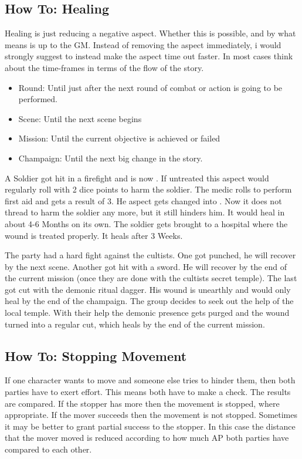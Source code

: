 \documentclass[11pt]{article}
\begin{document}
{\subsection{How To: Healing}
\label{sec:orgf635745}
Healing is just reducing a negative aspect. Whether this is possible, and by what means is up to the GM. Instead of removing the aspect immediately, i would strongly suggest to instead make the aspect time out faster. In most cases think about the time-frames in terms of the flow of the story.
\begin{itemize}
\item Round: Until just after the next round of combat or action is going to be performed.
\item Scene: Until the next scene begins
\item Mission: Until the current objective is achieved or failed
\item Champaign: Until the next big change in the story.
\end{itemize}

\begin{pwexample}
A Soldier got hit in a firefight and is now . If untreated this aspect would regularly roll with 2 dice points to harm the soldier. The medic rolls to perform first aid and gets a result of 3. He aspect gets changed into . Now it does not thread to harm the soldier any more, but it still hinders him. It would heal in about 4-6 Months on its own. The soldier gets brought to a hospital where the wound is treated properly. It heals after 3 Weeks. 
\end{pwexample}

\begin{pwexample}
The party had a hard fight against the cultists. One got punched, he will recover by the next scene. Another got hit with a sword. He will recover by the end of the current mission (once they are done with the cultists secret temple). The last got cut with the demonic ritual dagger. His wound is unearthly and would only heal by the end of the champaign. The group decides to seek out the help of the local temple. With their help the demonic presence gets purged and the wound turned into a regular cut, which heals by the end of the current mission.
\end{pwexample}
\subsection{How To: Stopping Movement}
\label{sec:orgd40d750}
If one character wants to move and someone else tries to hinder them, then both parties have to exert effort. This means both have to make a check. The results are compared. If the stopper has more then the movement is stopped, where appropriate. If the mover succeeds then the movement is not stopped. Sometimes it may be better to grant partial success to the stopper. In this case the distance that the mover moved is reduced according to how much AP both parties have compared to each other.
}
\end{document}

